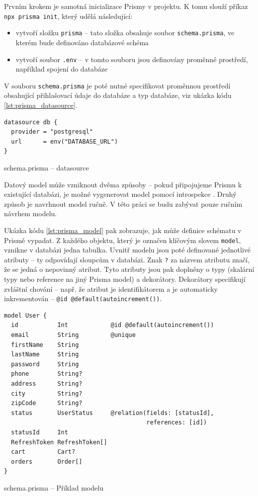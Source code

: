 \documentclass[thesis=M,czech]{FITthesis}[2019/12/23]
\begin{document}
Prvním krokem je samotná inicializace Prismy v projektu. K tomu slouží příkaz \texttt{npx prisma init}, který udělá následující:
\begin{itemize}
  \item vytvoří složku \texttt{prisma} -- tato složka obsahuje soubor \texttt{schema.prisma}, ve kterém bude definováno databázové schéma
  \item vytvoří soubor \texttt{.env} -- v tomto souboru jsou definovány proměnné prostředí, například spojení do databáze
\end{itemize}

V souboru \texttt{schema.prisma} je poté nutné specifikovat proměnnou prostředí obsahující přihlašovací údaje do databáze a typ databáze, viz ukázka kódu \ref{lst:prisma_datasource}.

\begin{listing}[H]
\begin{verbatim}
datasource db {
  provider = "postgresql"
  url      = env("DATABASE_URL")
}
\end{verbatim}
\caption{schema.prisma -- datasource}
\label{lst:prisma_datasource}
\end{listing}

Datový model může vzniknout dvěma způsoby -- pokud připojujeme Prismu k existující databázi, je možné vygenerovat model pomocí introspekce \cite{prisma_introspection}. Druhý způsob je navrhnout model ručně. V této práci se budu zabývat pouze ručním návrhem modelu.

Ukázka kódu \ref{lst:prisma_model} pak zobrazuje, jak může definice schématu v Prismě vypadat. Z každého objektu, který je označen klíčovým slovem \texttt{model}, vznikne v databázi jedna tabulka. Uvnitř modelu jsou poté definované jednotlivé atributy -- ty odpovídají sloupcům v databázi. Znak \texttt{?} za názvem atributu značí, že se jedná o nepovinný atribut. Tyto atributy jsou pak doplněny o typy (skalární typy nebo reference na jiný Prisma model) a dekorátory. Dekorátory specifikují zvláštní chování -- např. že atribut je identifikátorem a je automaticky inkrementován -- \texttt{@id @default(autoincrement())}.

\begin{listing}[H]
\begin{verbatim}
model User {
  id           Int            @id @default(autoincrement())
  email        String         @unique
  firstName    String
  lastName     String
  password     String
  phone        String?
  address      String?
  city         String?
  zipCode      String?
  status       UserStatus     @relation(fields: [statusId],
                                        references: [id])
  statusId     Int
  RefreshToken RefreshToken[]
  cart         Cart?
  orders       Order[]
}
\end{verbatim}
\caption{schema.prisma -- Příklad modelu}
\label{lst:prisma_model}
\end{listing}
\end{document}
